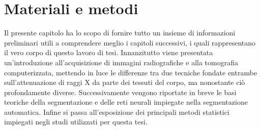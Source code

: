 \chapter{Materiali e metodi}
Il presente capitolo ha lo scopo di fornire tutto un insieme di informazioni preliminari utili a comprendere meglio i capitoli successivi, i quali rappresentano il vero corpo di questo lavoro di tesi. Innanzitutto viene presentata un'introduzione all'acquisizione di immagini radiografiche e alla tomografia computerizzata, mettendo in luce le differenze tra due tecniche fondate entrambe sull'attenuazione di raggi X da parte dei tessuti del corpo, ma nonostante ciò profondamente diverse. Successivamente vengono riportate in breve le basi teoriche della segmentazione e delle reti neurali impiegate nella segmentazione automatica. Infine si passa all'esposizione dei principali metodi statistici impiegati negli studi utilizzati per questa tesi.

